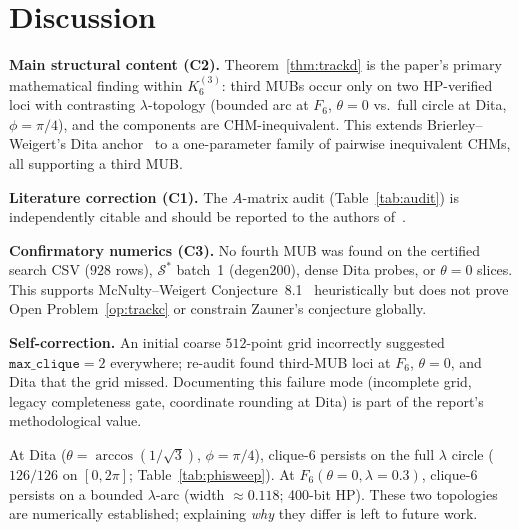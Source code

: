 \documentclass[onecolumn]{IEEEtran}
\begin{document}
\section{Discussion}
\label{sec:discussion}

\textbf{Main structural content (C2).} Theorem~\ref{thm:trackd} is the paper's primary mathematical finding within $K_6^{(3)}$: third MUBs occur only on two HP-verified loci with contrasting $\lambda$-topology (bounded arc at $F_6$, $\theta{=}0$ vs.\ full circle at Dita, $\phi{=}\pi/4$), and the components are CHM-inequivalent.
This extends Brierley--Weigert's Dita anchor~\cite{Brierley2009} to a one-parameter family of pairwise inequivalent CHMs, all supporting a third MUB.

\textbf{Literature correction (C1).} The $A$-matrix audit (Table~\ref{tab:audit}) is independently citable and should be reported to the authors of~\cite{McNulty2024}.

\textbf{Confirmatory numerics (C3).} No fourth MUB was found on the certified search CSV ($928$ rows), $\mathcal{S}^*$ batch~1 (degen200), dense Dita probes, or $\theta{=}0$ slices.
This supports McNulty--Weigert Conjecture~8.1~\cite{McNulty2024} heuristically but does not prove Open Problem~\ref{op:trackc} or constrain Zauner's conjecture globally.

\textbf{Self-correction.} An initial coarse $512$-point grid incorrectly suggested $\texttt{max\_clique}=2$ everywhere; re-audit found third-MUB loci at $F_6$, $\theta{=}0$, and Dita that the grid missed.
Documenting this failure mode (incomplete grid, legacy completeness gate, coordinate rounding at Dita) is part of the report's methodological value.

At Dita ($\theta=\arccos(1/\sqrt{3})$, $\phi=\pi/4$), clique-$6$ persists on the full $\lambda$ circle ($126/126$ on $[0,2\pi]$; Table~\ref{tab:phisweep}).
At $F_6(\theta{=}0,\lambda{=}0.3)$, clique-$6$ persists on a bounded $\lambda$-arc (width $\approx0.118$; 400-bit HP).
These two topologies are numerically established; explaining \emph{why} they differ is left to future work.
\end{document}
